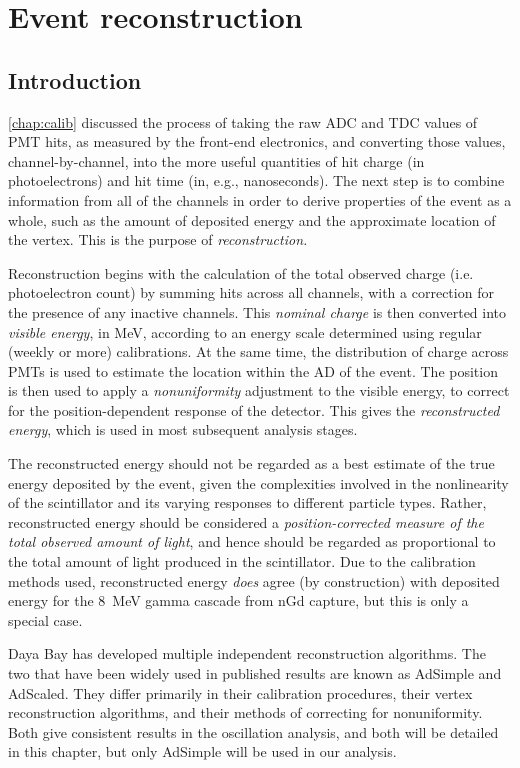 \documentclass[../thesis.tex]{subfiles}
\begin{document}
\chapter{Event reconstruction}
\label{chap:recon}

\section{Introduction}
\label{sec:reconIntro}

\autoref{chap:calib} discussed the process of taking the raw ADC and TDC values
of PMT hits, as measured by the front-end electronics, and converting those
values, channel-by-channel, into the more useful quantities of hit charge (in
photoelectrons) and hit time (in, e.g., nanoseconds). The next step is to
combine information from all of the channels in order to derive properties of
the event as a whole, such as the amount of deposited energy and the approximate
location of the vertex. This is the purpose of \emph{reconstruction.}

Reconstruction begins with the calculation of the total observed charge
(i.e. photoelectron count) by summing hits across all channels, with a
correction for the presence of any inactive channels. This \emph{nominal charge}
is then converted into \emph{visible energy}, in MeV, according to an energy
scale determined using regular (weekly or more) calibrations. At the same time,
the distribution of charge across PMTs is used to estimate the location within
the AD of the event. The position is then used to apply a \emph{nonuniformity}
adjustment to the visible energy, to correct for the position-dependent response
of the detector. This gives the \emph{reconstructed energy}, which is used in
most subsequent analysis stages.

The reconstructed energy should not be regarded as a best estimate of the true
energy deposited by the event, given the complexities involved in the
nonlinearity of the scintillator and its varying responses to different particle
types. Rather, reconstructed energy should be considered a
\emph{position-corrected measure of the total observed amount of light}, and
hence should be regarded as proportional to the total amount of light produced
in the scintillator. Due to the calibration methods used, reconstructed energy
\emph{does} agree (by construction) with deposited energy for the 8~MeV gamma
cascade from nGd capture, but this is only a special case.

Daya Bay has developed multiple independent reconstruction algorithms. The two
that have been widely used in published results are known as AdSimple and
AdScaled. They differ primarily in their calibration procedures, their vertex
reconstruction algorithms, and their methods of correcting for
nonuniformity. Both give consistent results in the oscillation analysis, and
both will be detailed in this chapter, but only AdSimple will be used in our
analysis.
\end{document}
